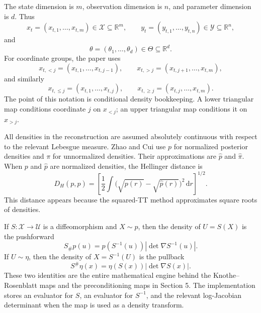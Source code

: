 \documentclass[11pt]{article}
\numberwithin{equation}{section}
\newcommand{\R}{\mathbb R}
\newcommand{\dd}{\,\mathrm d}
\begin{document}
The state dimension is \(m\), observation dimension is \(n\), and parameter
dimension is \(d\).  Thus
\[
    x_t=(x_{t,1},\ldots,x_{t,m})\in\mathcal X\subseteq\R^m,
    \qquad
    y_t=(y_{t,1},\ldots,y_{t,n})\in\mathcal Y\subseteq\R^n,
\]
and
\[
    \theta=(\theta_1,\ldots,\theta_d)\in\Theta\subseteq\R^d.
\]
For coordinate groups, the paper uses
\begin{equation}
    x_{t,<j}=(x_{t,1},\ldots,x_{t,j-1}),\qquad
    x_{t,>j}=(x_{t,j+1},\ldots,x_{t,m}),
    \label{eq:p24-n1}
\end{equation}
and similarly
\begin{equation}
    x_{t,\le j}=(x_{t,1},\ldots,x_{t,j}),\qquad
    x_{t,\ge j}=(x_{t,j},\ldots,x_{t,m}).
    \label{eq:p24-n2}
\end{equation}
The point of this notation is conditional density bookkeeping.  A lower
triangular map conditions coordinate \(j\) on \(x_{<j}\); an upper triangular
map conditions it on \(x_{>j}\).

All densities in the reconstruction are assumed absolutely continuous with
respect to the relevant Lebesgue measure.  Zhao and Cui \cite{zhao2024ttsequential} use \(p\) for normalized
posterior densities and \(\pi\) for unnormalized densities.  Their
approximations are \(\widehat p\) and \(\widehat\pi\).  When \(p\) and
\(\widehat p\) are normalized densities, the Hellinger distance is
\begin{equation}
    D_H(p,\widehat p)
    =
    \left[
    \frac12
    \int
    \bigl(\sqrt{p(r)}-\sqrt{\widehat p(r)}\bigr)^2\dd r
    \right]^{1/2}.
    \label{eq:p24-n3}
\end{equation}
This distance appears because the squared-TT method approximates square roots
of densities.

If \(S:\mathcal X\to\mathcal U\) is a diffeomorphism and \(X\sim p\), then
the density of \(U=S(X)\) is the pushforward
\begin{equation}
    S_\#p(u)
    =
    p(S^{-1}(u))\left|\det\nabla S^{-1}(u)\right|.
    \label{eq:p24-n4}
\end{equation}
If \(U\sim\eta\), then the density of \(X=S^{-1}(U)\) is the pullback
\begin{equation}
    S^\#\eta(x)
    =
    \eta(S(x))\left|\det\nabla S(x)\right|.
    \label{eq:p24-n5}
\end{equation}
These two identities are the entire mathematical engine behind the
Knothe--Rosenblatt maps and the preconditioning maps in Section 5.  The
implementation stores an evaluator for \(S\), an evaluator for \(S^{-1}\), and
the relevant log-Jacobian determinant when the map is used as a density
transform.
\end{document}
